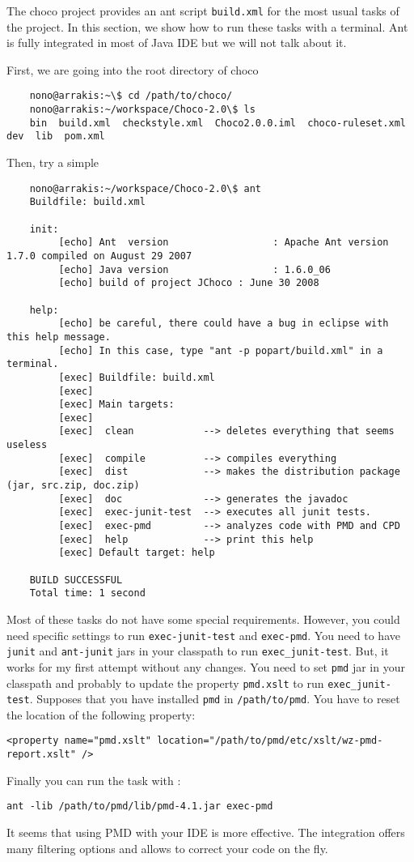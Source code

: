 The choco project provides an ant script \texttt{build.xml} for the most usual tasks of the project.
In this section, we show how to run these tasks with a terminal. Ant is fully integrated in most of Java IDE but we will not talk about it.

First, we are going into the root directory of choco
\begin{lstlisting}
	nono@arrakis:~\$ cd /path/to/choco/
	nono@arrakis:~/workspace/Choco-2.0\$ ls
	bin  build.xml  checkstyle.xml  Choco2.0.0.iml  choco-ruleset.xml  dev  lib  pom.xml
\end{lstlisting}
Then, try a simple 
\begin{lstlisting}
	nono@arrakis:~/workspace/Choco-2.0\$ ant
	Buildfile: build.xml
	
	init:
	     [echo] Ant  version                  : Apache Ant version 1.7.0 compiled on August 29 2007
	     [echo] Java version                  : 1.6.0_06
	     [echo] build of project JChoco : June 30 2008
	
	help:
	     [echo] be careful, there could have a bug in eclipse with this help message.
	     [echo] In this case, type "ant -p popart/build.xml" in a terminal.     
	     [exec] Buildfile: build.xml
	     [exec] 
	     [exec] Main targets:
	     [exec] 
	     [exec]  clean            --> deletes everything that seems useless
	     [exec]  compile          --> compiles everything
	     [exec]  dist             --> makes the distribution package (jar, src.zip, doc.zip)
	     [exec]  doc              --> generates the javadoc
	     [exec]  exec-junit-test  --> executes all junit tests.
	     [exec]  exec-pmd         --> analyzes code with PMD and CPD
	     [exec]  help             --> print this help
	     [exec] Default target: help
	
	BUILD SUCCESSFUL
	Total time: 1 second
\end{lstlisting}

Most of these tasks do not have some special requirements. However, you could need specific settings to run \texttt{exec-junit-test} and \texttt{exec-pmd}.
You need to have \texttt{junit} and \texttt{ant-junit} jars in your classpath to run \texttt{exec\_junit-test}. But, it works for my first attempt without any changes.
You need to set \texttt{pmd} jar in your classpath and probably to update the property \texttt{pmd.xslt} to run \texttt{exec\_junit-test}.
Supposes that you have installed \texttt{pmd} in \texttt{/path/to/pmd}. You have to reset the location of the following property:
\begin{lstlisting}
<property name="pmd.xslt" location="/path/to/pmd/etc/xslt/wz-pmd-report.xslt" />
\end{lstlisting}
Finally you can run the task with :
\begin{lstlisting}
ant -lib /path/to/pmd/lib/pmd-4.1.jar exec-pmd
\end{lstlisting}
It seems that using PMD with your IDE is more effective. The integration offers many filtering options and allows to correct your code on the fly.

